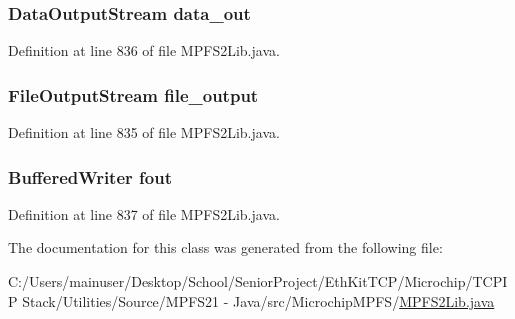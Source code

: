 \subsubsection[{data\+\_\+out}]{\setlength{\rightskip}{0pt plus 5cm}Data\+Output\+Stream data\+\_\+out}\label{class_microchip_m_p_f_s_1_1_m_p_f_s2_lib_1_1_m_p_f_s2_a_s_m30_writer_aa84dd7c55e2064a5c35cd88bc52176e3}


Definition at line 836 of file M\+P\+F\+S2\+Lib.\+java.

\hypertarget{class_microchip_m_p_f_s_1_1_m_p_f_s2_lib_1_1_m_p_f_s2_a_s_m30_writer_ab03cefa914341b065e79a003ebc36ba5}{}
\subsubsection[{file\+\_\+output}]{\setlength{\rightskip}{0pt plus 5cm}File\+Output\+Stream file\+\_\+output}\label{class_microchip_m_p_f_s_1_1_m_p_f_s2_lib_1_1_m_p_f_s2_a_s_m30_writer_ab03cefa914341b065e79a003ebc36ba5}


Definition at line 835 of file M\+P\+F\+S2\+Lib.\+java.

\hypertarget{class_microchip_m_p_f_s_1_1_m_p_f_s2_lib_1_1_m_p_f_s2_a_s_m30_writer_aac232ca8514f156a01d70fd44afdd7c1}{}
\subsubsection[{fout}]{\setlength{\rightskip}{0pt plus 5cm}Buffered\+Writer fout}\label{class_microchip_m_p_f_s_1_1_m_p_f_s2_lib_1_1_m_p_f_s2_a_s_m30_writer_aac232ca8514f156a01d70fd44afdd7c1}


Definition at line 837 of file M\+P\+F\+S2\+Lib.\+java.



The documentation for this class was generated from the following file\+:\begin{DoxyCompactItemize}
\item 
C\+:/\+Users/mainuser/\+Desktop/\+School/\+Senior\+Project/\+Eth\+Kit\+T\+C\+P/\+Microchip/\+T\+C\+P\+I\+P Stack/\+Utilities/\+Source/\+M\+P\+F\+S21 -\/ Java/src/\+Microchip\+M\+P\+F\+S/\hyperlink{_m_p_f_s2_lib_8java}{M\+P\+F\+S2\+Lib.\+java}\end{DoxyCompactItemize}
